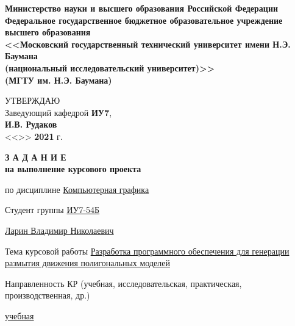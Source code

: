\thispagestyle{empty}
\begin{center}
    \fontsize{11pt}{0.3\baselineskip}\selectfont \textbf{Министерство науки и высшего образования Российской Федерации \\ Федеральное государственное бюджетное образовательное учреждение \\ высшего образования \\ <<Московский государственный технический университет имени Н.Э. Баумана \\ (национальный исследовательский университет)>> \\ (МГТУ им. Н.Э. Баумана)}
    \makebox[\linewidth]{\rule{\textwidth}{3pt}}
    \begin{flushright}
        \fontsize{11pt}{0.5\baselineskip}\selectfont
            УТВЕРЖДАЮ \\ Заведующий кафедрой \textbf{ИУ7}, \\
            \uline{\mbox{\hspace*{2cm}}}
            \textbf{И.В. Рудаков} \\
            <<\uline{\mbox{\hspace*{1cm}}}>>
            \uline{\mbox{\hspace*{2.5cm}}}
            \textbf{2021} г.
    \end{flushright}
\end{center}


\begin{center}
    \fontsize{18pt}{0.6\baselineskip}\selectfont \textbf{З А Д А Н И Е}\\
    \fontsize{16pt}{0.6\baselineskip}\selectfont \textbf{на выполнение курсового проекта}
\end{center}

\normalsize

\begingroup
\fontsize{12pt}{0.5\baselineskip}\selectfont
\setlength{\parskip}{0.1em}
\setlength{\parindent}{0em}
по дисциплине \uline{\hfill Компьютерная графика \hfill}

Студент группы \uline{\hfill ИУ7-54Б \hfill}

\uline{\hfill Ларин Владимир Николаевич \hfill}

Тема курсовой работы \uline{Разработка   программного   обеспечения   для генерации размытия движения полигональных моделей \hfill}

Направленность КР (учебная, исследовательская, практическая, производственная, др.)

\uline{\hfill учебная \hfill}

